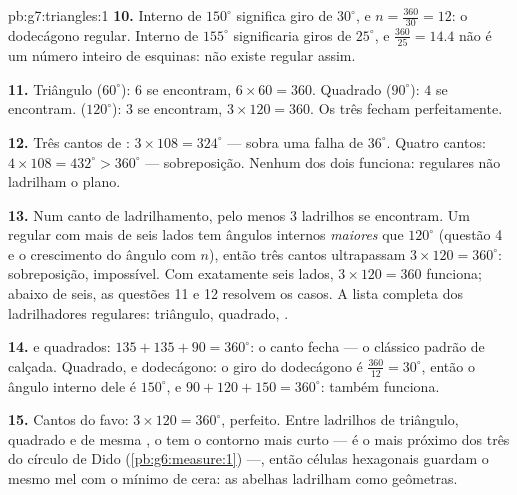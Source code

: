 \begin{solution}{pb:g7:triangles:1}
\textbf{10.} Interno de $150^\circ$ significa giro de $30^\circ$, e
$n = \frac{360}{30} = 12$: o dodecágono regular. Interno de $155^\circ$
significaria giros de $25^\circ$, e $\frac{360}{25} = 14.4$ não é um
número inteiro de esquinas: não existe  regular assim.

\textbf{11.} Triângulo ($60^\circ$): $6$ se encontram,
$6 \times 60 = 360$. Quadrado ($90^\circ$): $4$ se encontram. 
($120^\circ$): $3$ se encontram, $3 \times 120 = 360$. Os três fecham
perfeitamente.

\textbf{12.} Três cantos de : $3 \times 108 = 324^\circ$ ---
sobra uma falha de $36^\circ$. Quatro cantos:
$4 \times 108 = 432^\circ > 360^\circ$ --- sobreposição. Nenhum dos
dois funciona:  regulares não ladrilham o plano.

\textbf{13.} Num canto de ladrilhamento, pelo menos $3$ ladrilhos se
encontram. Um  regular com mais de seis lados tem ângulos
internos \emph{maiores} que $120^\circ$ (questão 4 e o crescimento do
ângulo com $n$), então três cantos ultrapassam
$3 \times 120 = 360^\circ$: sobreposição, impossível. Com exatamente
seis lados, $3 \times 120 = 360$ funciona; abaixo de seis, as questões
11 e 12 resolvem os casos. A lista completa dos ladrilhadores
regulares: triângulo, quadrado, .

\textbf{14.}  e quadrados: $135 + 135 + 90 = 360^\circ$: o
canto fecha --- o clássico padrão de calçada. Quadrado,  e
dodecágono: o giro do dodecágono é $\frac{360}{12} = 30^\circ$, então o
ângulo interno dele é $150^\circ$, e $90 + 120 + 150 = 360^\circ$:
também funciona.

\textbf{15.} Cantos do favo: $3 \times 120 = 360^\circ$, perfeito.
Entre ladrilhos de triângulo, quadrado e  de mesma , o
 tem o contorno mais curto --- é o mais próximo dos três do
círculo de Dido (\cref{pb:g6:measure:1}) ---, então células hexagonais
guardam o mesmo mel com o mínimo de cera: as abelhas ladrilham como
geômetras.
\end{solution}
